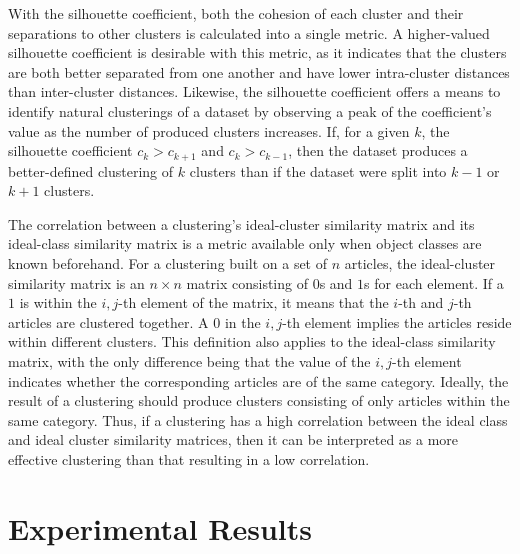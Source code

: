 \documentclass[11pt]{article}
\begin{document}
With the silhouette coefficient, both the cohesion of each cluster and their separations to other clusters is calculated into a single metric.
A higher-valued silhouette coefficient is desirable with this metric, as it indicates that the clusters are both better separated from one another and have lower intra-cluster distances than inter-cluster distances.
Likewise, the silhouette coefficient offers a means to identify natural clusterings of a dataset by observing a peak of the coefficient's value as the number of produced clusters increases.
If, for a given $k$, the silhouette coefficient $c_{k} > c_{k+1}$ and $c_{k} > c_{k-1}$, then the dataset produces a better-defined clustering of $k$ clusters than if the dataset were split into $k-1$ or $k+1$ clusters.

The correlation between a clustering's ideal-cluster similarity matrix and its ideal-class similarity matrix is a metric available only when object classes are known beforehand.
For a clustering built on a set of $n$ articles, the ideal-cluster similarity matrix is an $n \times n$ matrix consisting of $0$s and $1$s for each element.
If a $1$ is within the $i,j$-th element of the matrix, it means that the $i$-th and $j$-th articles are clustered together.
A $0$ in the $i,j$-th element implies the articles reside within different clusters.
This definition also applies to the ideal-class similarity matrix, with the only difference being that the value of the $i,j$-th element indicates whether the corresponding articles are of the same category.
Ideally, the result of a clustering should produce clusters consisting of only articles within the same category.
Thus, if a clustering has a high correlation between the ideal class and ideal cluster similarity matrices, then it can be interpreted as a more effective clustering than that resulting in a low correlation.


\section{Experimental Results} \label{sec:experiments}
\end{document}
